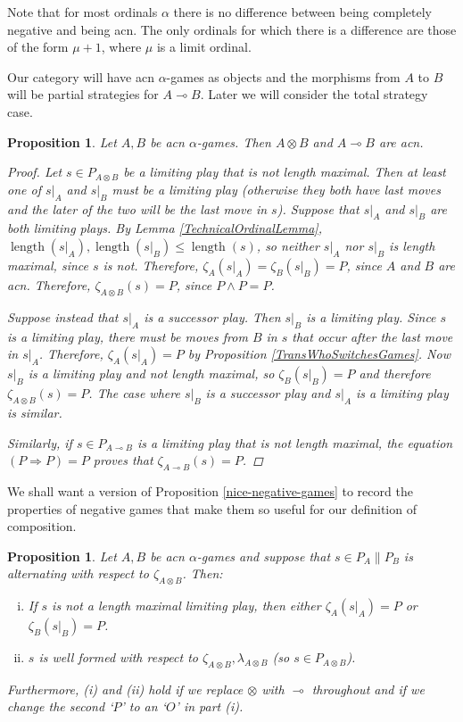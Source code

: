 \documentclass[11pt]{article} %
\theoremstyle{plain} %
\newtheorem{proposition}[theorem]{Proposition}
\theoremstyle{definition} %
\theoremstyle{note}
\theoremstyle{exercisestyle}
\newcommand{\tensor}{\otimes}
\renewcommand{\implies}{\multimap}
\DeclareMathOperator{\length}{length}
\begin{document}
Note that for most ordinals $\alpha$ there is no difference between being completely negative and being acn.  The only ordinals for which there is  a difference are those of the form $\mu+1$, where $\mu$ is a limit ordinal.  

Our category will have acn $\alpha$-games as objects and the morphisms from $A$ to $B$ will be partial strategies for $A\implies B$.  Later we will consider the total strategy case.

\begin{proposition}
  Let $A,B$ be acn $\alpha$-games.  Then $A\tensor B$ and $A\implies B$ are acn.
  \begin{proof}
    Let $s\in P_{A\tensor B}$ be a limiting play that is not length maximal.  Then at least one of $s\vert_A$ and $s\vert_B$ must be a limiting play (otherwise they both have last moves and the later of the two will be the last move in $s$).  Suppose that $s\vert_A$ and $s\vert_B$ are both limiting plays.  By Lemma \ref{TechnicalOrdinalLemma}, $\length(s\vert_A),\length(s\vert_B)\le\length(s)$, so neither $s\vert_A$ nor $s\vert_B$ is length maximal, since $s$ is not.  Therefore, $\zeta_A(s\vert_A)=\zeta_B(s\vert_B)=P$, since $A$ and $B$ are acn.  Therefore, $\zeta_{A\tensor B}(s)=P$, since $P\wedge P=P$.

    Suppose instead that $s\vert_A$ is a successor play.  Then $s\vert_B$ is a limiting play.  Since $s$ is a limiting play, there must be moves from $B$ in $s$ that occur after the last move in $s\vert_A$.  Therefore, $\zeta_A(s\vert_A)=P$ by Proposition \ref{TransWhoSwitchesGames}.  Now $s\vert_B$ is a limiting play and not length maximal, so $\zeta_B(s\vert_B)=P$ and therefore $\zeta_{A\tensor B}(s)=P$.  The case where $s\vert_B$ is a successor play and $s\vert_A$ is a limiting play is similar.

    Similarly, if $s\in P_{A\implies B}$ is a limiting play that is not length maximal, the equation $(P\Rightarrow P)=P$ proves that $\zeta_{A\implies B}(s)=P$.
  \end{proof}
\end{proposition}

We shall want a version of Proposition \ref{nice-negative-games} to record the properties of negative games that make them so useful for our definition of composition.

\begin{proposition}
  \label{NiceAcnGames}
  Let $A,B$ be acn $\alpha$-games and suppose that $s\in P_A\|P_B$ is alternating with respect to $\zeta_{A\tensor B}$.  Then:
  \begin{enumerate}[i)]
    \item If $s$ is not a length maximal limiting play, then either $\zeta_A(s\vert_A)=P$ or $\zeta_B(s\vert_B)=P$.  
    \item $s$ is well formed with respect to $\zeta_{A\tensor B},\lambda_{A\tensor B}$ (so $s\in P_{A\tensor B}$).
  \end{enumerate}
  Furthermore, (i) and (ii) hold if we replace $\tensor$ with $\implies$ throughout and if we change the second `$P$' to an `$O$' in part (i).
\end{proposition}
\end{document}

